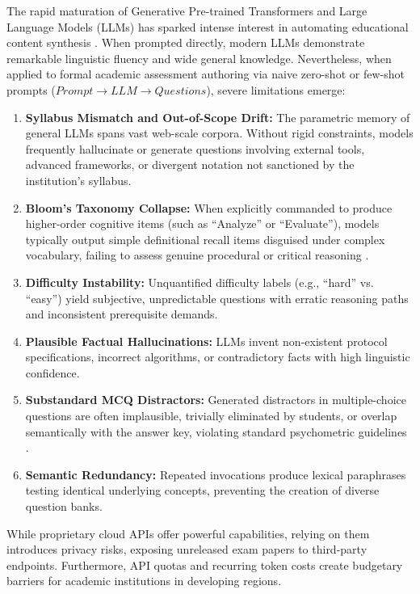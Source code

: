 \documentclass[conference]{IEEEtran}
\begin{document}
The rapid maturation of Generative Pre-trained Transformers and Large Language Models (LLMs) has sparked intense interest in automating educational content synthesis \cite{vaswani2017attention, devlin2019bert}. When prompted directly, modern LLMs demonstrate remarkable linguistic fluency and wide general knowledge. Nevertheless, when applied to formal academic assessment authoring via naive zero-shot or few-shot prompts ($Prompt \to LLM \to Questions$), severe limitations emerge:
\begin{enumerate}
    \item \textbf{Syllabus Mismatch and Out-of-Scope Drift:} The parametric memory of general LLMs spans vast web-scale corpora. Without rigid constraints, models frequently hallucinate or generate questions involving external tools, advanced frameworks, or divergent notation not sanctioned by the institution's syllabus.
    \item \textbf{Bloom's Taxonomy Collapse:} When explicitly commanded to produce higher-order cognitive items (such as ``Analyze'' or ``Evaluate''), models typically output simple definitional recall items disguised under complex vocabulary, failing to assess genuine procedural or critical reasoning \cite{duong2024bloomllm}.
    \item \textbf{Difficulty Instability:} Unquantified difficulty labels (e.g., ``hard'' vs. ``easy'') yield subjective, unpredictable questions with erratic reasoning paths and inconsistent prerequisite demands.
    \item \textbf{Plausible Factual Hallucinations:} LLMs invent non-existent protocol specifications, incorrect algorithms, or contradictory facts with high linguistic confidence.
    \item \textbf{Substandard MCQ Distractors:} Generated distractors in multiple-choice questions are often implausible, trivially eliminated by students, or overlap semantically with the answer key, violating standard psychometric guidelines \cite{luo2024chain}.
    \item \textbf{Semantic Redundancy:} Repeated invocations produce lexical paraphrases testing identical underlying concepts, preventing the creation of diverse question banks.
\end{enumerate}

While proprietary cloud APIs offer powerful capabilities, relying on them introduces privacy risks, exposing unreleased exam papers to third-party endpoints. Furthermore, API quotas and recurring token costs create budgetary barriers for academic institutions in developing regions.
\end{document}
